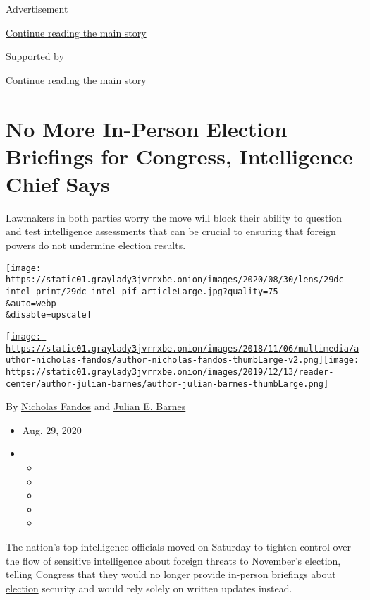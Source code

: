 Advertisement

\protect\hyperlink{after-top}{Continue reading the main story}

Supported by

\protect\hyperlink{after-sponsor}{Continue reading the main story}

\hypertarget{no-more-in-person-election-briefings-for-congress-intelligence-chief-says}{%
\section{No More In-Person Election Briefings for Congress, Intelligence
Chief
Says}\label{no-more-in-person-election-briefings-for-congress-intelligence-chief-says}}

Lawmakers in both parties worry the move will block their ability to
question and test intelligence assessments that can be crucial to
ensuring that foreign powers do not undermine election results.

\texttt{[image: https://static01.graylady3jvrrxbe.onion/images/2020/08/30/lens/29dc-intel-print/29dc-intel-pif-articleLarge.jpg?quality=75\\\&auto=webp\\\&disable=upscale]}

\href{https://www.nytimes3xbfgragh.onion/by/nicholas-fandos}{\texttt{[image: https://static01.graylady3jvrrxbe.onion/images/2018/11/06/multimedia/author-nicholas-fandos/author-nicholas-fandos-thumbLarge-v2.png]}}\href{https://www.nytimes3xbfgragh.onion/by/julian-e-barnes}{\texttt{[image: https://static01.graylady3jvrrxbe.onion/images/2019/12/13/reader-center/author-julian-barnes/author-julian-barnes-thumbLarge.png]}}

By \href{https://www.nytimes3xbfgragh.onion/by/nicholas-fandos}{Nicholas
Fandos} and
\href{https://www.nytimes3xbfgragh.onion/by/julian-e-barnes}{Julian E.
Barnes}

\begin{itemize}
\item
  Aug. 29, 2020
\item
  \begin{itemize}
  \item
  \item
  \item
  \item
  \item
  \end{itemize}
\end{itemize}

The nation's top intelligence officials moved on Saturday to tighten
control over the flow of sensitive intelligence about foreign threats to
November's election, telling Congress that they would no longer provide
in-person briefings about
\href{https://www.nytimes3xbfgragh.onion/live/2020/08/31/us/trump-vs-biden}{election}
security and would rely solely on written updates instead.

